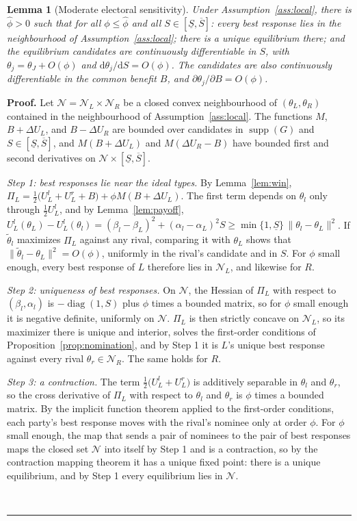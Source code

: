 \documentclass[12pt,letterpaper]{article}
\newtheorem{lemma}{Lemma}
\newenvironment{proof}[1][Proof]{\noindent\textbf{#1.} }{\ \rule{0.5em}{0.5em}}
\begin{document}
\begin{lemma}[Moderate electoral sensitivity]\label{lem:smallh}
Under Assumption~\ref{ass:local}, there is $\hat \phi>0$ such that for all $\phi\le\hat \phi$ and all $S\in[\underline S,\overline S]$: every best response lies in the neighbourhood of Assumption~\ref{ass:local}; there is a unique equilibrium there; and the equilibrium candidates are continuously differentiable in $S$, with $\theta_j=\theta_J+O(\phi)$ and $\mathrm{d}\theta_j/\mathrm{d}S=O(\phi)$. The candidates are also continuously differentiable in the common benefit $B$, and $\partial\theta_j/\partial B=O(\phi)$.
\end{lemma}

\begin{proof}
Let $\mathcal{N}=\mathcal{N}_L\times\mathcal{N}_R$ be a closed convex neighbourhood of $(\theta_L,\theta_R)$ contained in the neighbourhood of Assumption~\ref{ass:local}. The functions $M$, $B+\Delta U_L$, and $B-\Delta U_R$ are bounded over candidates in $\operatorname{supp}(G)$ and $S\in[\underline S,\overline S]$, and $M(B+\Delta U_L)$ and $M(\Delta U_R-B)$ have bounded first and second derivatives on $\mathcal{N}\times[\underline S,\overline S]$.

\emph{Step 1: best responses lie near the ideal types.} By Lemma~\ref{lem:win}, $\Pi_L=\tfrac12\big(U_L^l+U_L^r+B\big)+\phi M(B+\Delta U_L)$. The first term depends on $\theta_l$ only through $\tfrac12U_L^l$, and by Lemma~\ref{lem:payoff}, $U_L^l(\theta_L)-U_L^l(\theta_l)=(\beta_l-\beta_L)^2+(\alpha_l-\alpha_L)^2S\ge\min\{1,\underline S\}\,\|\theta_l-\theta_L\|^2$. If $\tilde\theta_l$ maximizes $\Pi_L$ against any rival, comparing it with $\theta_L$ shows that $\|\tilde\theta_l-\theta_L\|^2=O(\phi)$, uniformly in the rival's candidate and in $S$. For $\phi$ small enough, every best response of $L$ therefore lies in $\mathcal{N}_L$, and likewise for $R$.

\emph{Step 2: uniqueness of best responses.} On $\mathcal{N}$, the Hessian of $\Pi_L$ with respect to $(\beta_l,\alpha_l)$ is $-\operatorname{diag}(1,S)$ plus $\phi$ times a bounded matrix, so for $\phi$ small enough it is negative definite, uniformly on $\mathcal{N}$. $\Pi_L$ is then strictly concave on $\mathcal{N}_L$, so its maximizer there is unique and interior, solves the first-order conditions of Proposition~\ref{prop:nomination}, and by Step 1 it is $L$'s unique best response against every rival $\theta_r\in \mathcal{N}_R$. The same holds for $R$.

\emph{Step 3: a contraction.} The term $\tfrac12\big(U_L^l+U_L^r\big)$ is additively separable in $\theta_l$ and $\theta_r$, so the cross derivative of $\Pi_L$ with respect to $\theta_l$ and $\theta_r$ is $\phi$ times a bounded matrix. By the implicit function theorem \citep{Sundaram1996} applied to the first-order conditions, each party's best response moves with the rival's nominee only at order $\phi$. For $\phi$ small enough, the map that sends a pair of nominees to the pair of best responses maps the closed set $\mathcal{N}$ into itself by Step 1 and is a contraction, so by the contraction mapping theorem \citep{Ok2007} it has a unique fixed point: there is a unique equilibrium, and by Step 1 every equilibrium lies in $\mathcal{N}$.


\end{proof}
\end{document}
